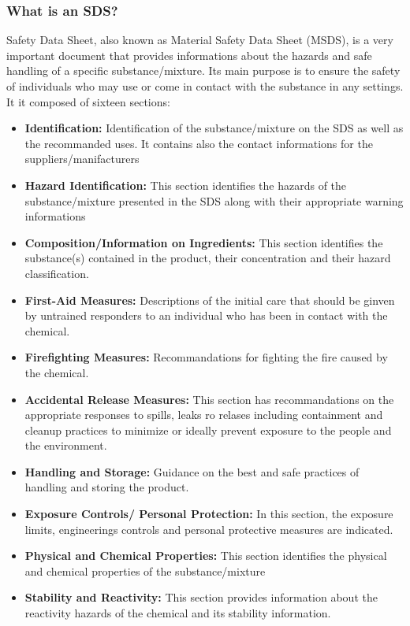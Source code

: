 \documentclass[a4paper,12pt,twoside]{report}
\begin{document}
\subsubsection{What is an SDS?}
Safety Data Sheet, also known as Material Safety Data Sheet (MSDS), is a very important document that provides informations about the hazards and safe handling of a specific substance/mixture. Its main purpose is to ensure the safety of individuals who may use or come in contact with the substance in any settings. It it composed of sixteen sections:
\begin{itemize}
\item \textbf{Identification:} Identification of the substance/mixture on the SDS as well as the recommanded uses. It contains also the contact informations for the suppliers/manifacturers
\item  \textbf{Hazard Identification:} This section identifies the hazards of the substance/mixture presented in the SDS along with their appropriate warning informations
\item  \textbf{Composition/Information on Ingredients:} This section identifies the substance(s) contained in the product, their concentration and their hazard classification.
\item \textbf{First-Aid Measures:} Descriptions of the initial care that should be ginven by untrained responders to an individual who has been in contact with the chemical.
\item \textbf{Firefighting Measures:} Recommandations for fighting the fire caused by the chemical.
\item \textbf{Accidental Release Measures:} This section has recommandations on the appropriate responses to spills, leaks ro relases including containment and cleanup practices to minimize or ideally prevent exposure to the people and the environment.
\item \textbf{Handling and Storage:} Guidance on the best and safe practices of handling and storing the product.
\item \textbf{Exposure Controls/ Personal Protection:} In this section, the exposure limits, engineerings controls and personal protective measures are indicated.
\item \textbf{Physical and Chemical Properties:} This section identifies the physical and chemical properties of the substance/mixture
\item \textbf{Stability and Reactivity:} This section provides information about the reactivity hazards of the chemical and its stability information.

\end{itemize}
\end{document}
